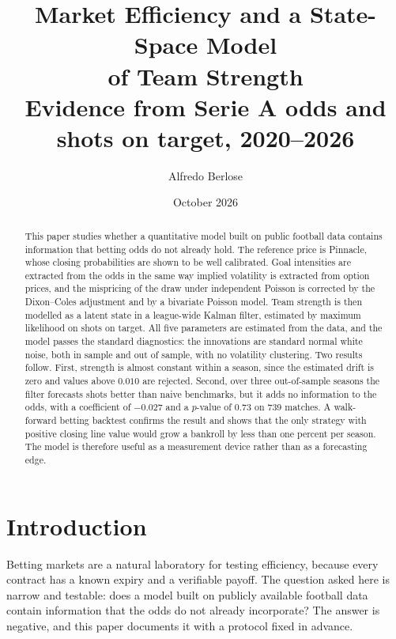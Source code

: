 \documentclass[11pt,a4paper]{article}
\title{\textbf{Market Efficiency and a State-Space Model\\ of Team Strength}\\[6pt]
\large Evidence from Serie A odds and shots on target, 2020--2026}
\author{Alfredo Berlose}
\date{October 2026}
\begin{document}
\maketitle

\begin{abstract}
\noindent This paper studies whether a quantitative model built on public football data contains
information that betting odds do not already hold. The reference price is Pinnacle, whose closing
probabilities are shown to be well calibrated. Goal intensities are extracted from the odds in the
same way implied volatility is extracted from option prices, and the mispricing of the draw under
independent Poisson is corrected by the Dixon--Coles adjustment and by a bivariate Poisson model.
Team strength is then modelled as a latent state in a league-wide Kalman filter, estimated by maximum
likelihood on shots on target. All five parameters are estimated from the data, and the model passes
the standard diagnostics: the innovations are standard normal white noise, both in sample and out of
sample, with no volatility clustering. Two results follow. First, strength is almost constant within a
season, since the estimated drift is zero and values above $0.010$ are rejected. Second, over three
out-of-sample seasons the filter forecasts shots better than naive benchmarks, but it adds no
information to the odds, with a coefficient of $-0.027$ and a $p$-value of $0.73$ on 739 matches. A
walk-forward betting backtest confirms the result and shows that the only strategy with positive
closing line value would grow a bankroll by less than one percent per season. The model is therefore
useful as a measurement device rather than as a forecasting edge.
\end{abstract}

\tableofcontents
\newpage

\section{Introduction}
Betting markets are a natural laboratory for testing efficiency, because every contract has a known
expiry and a verifiable payoff. The question asked here is narrow and testable: does a model built on
publicly available football data contain information that the odds do not already incorporate? The
answer is negative, and this paper documents it with a protocol fixed in advance.
\end{document}
